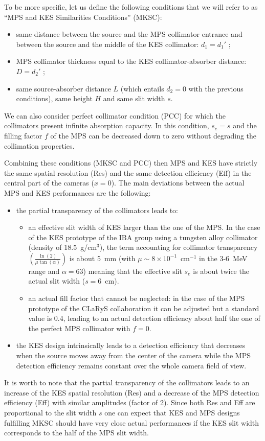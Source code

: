 \documentclass[a4paper,english,12pt]{article}
\begin{document}
To be more specific, let us define the following conditions that we will refer to as \enquote{MPS and KES Similarities Conditions} (MKSC):
\begin{itemize}
	\item same distance between the source and the MPS collimator entrance and between the source and the middle of the KES collimator: $d_1=d_1'$ ;
	\item MPS collimator thickness equal to the KES collimator-absorber distance: $D=d_2'$ ;
	\item same source-absorber distance $L$ (which entails $d_2=0$ with the previous conditions), same height $H$ and same slit width $s$.	
\end{itemize}
We can also consider perfect collimator condition (PCC) for which the collimators present infinite absorption capacity. In this condition, $s_e=s$ and the filling factor $f$ of the MPS can be decreased down to zero without degrading the collimation properties.

Combining these conditions (MKSC and PCC) then MPS and KES have strictly the same spatial resolution (Res) and the same detection efficiency (Eff) in the central part of the cameras ($x=0$). The main deviations between the actual MPS and KES performances are the following: 
\begin{itemize}
	\item the partial transparency of the collimators leads to:
	\begin{itemize}
		\item an effective slit width of KES larger than the one of the MPS. In the case of the KES prototype of the IBA group using a tungsten alloy collimator (density of 18.5~g/cm$^3$), the term accounting for collimator transparency $\left(\frac{\ln(2)}{\mu \tan(\alpha)}\right)$ is about 5~mm (with $\mu\sim 8\times10^{-1}$~cm$^{-1}$ in the 3-6~MeV range and $\alpha=63$\textdegree) meaning that the effective slit $s_e$ is about twice the actual slit width ($s=6$~cm).
		\item an actual fill factor that cannot be neglected: in the case of the MPS prototype of the CLaRyS collaboration it can be adjusted but a standard value is 0.4, leading to an actual detection efficiency about half the one of the perfect MPS collimator with $f=0$. 
	\end{itemize}
	\item the KES design intrinsically leads to a detection efficiency that decreases when the source moves away from the center of the camera while the MPS detection efficiency remains constant over the whole camera field of view.
\end{itemize}
It is worth to note that the partial transparency of the collimators leads to an increase of the KES spatial resolution (Res) and a decrease of the MPS detection efficiency (Eff) with similar amplitudes (factor of 2). Since both Res and Eff are proportional to the slit width $s$ one can expect that KES and MPS designs fulfilling MKSC should have very close actual performances if the KES slit width corresponds to the half of the MPS slit width. 
\end{document}
